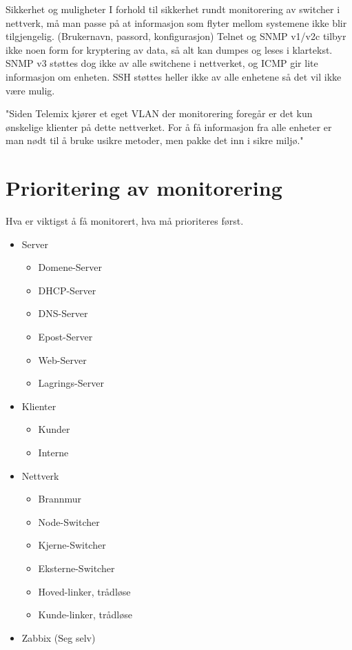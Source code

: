 \begin{tanke}{Sikkerhet og muligheter}
    I forhold til sikkerhet rundt monitorering av switcher i nettverk, må man passe på at informasjon som flyter mellom systemene ikke blir tilgjengelig. (Brukernavn, passord, konfigurasjon)
    Telnet og SNMP v1/v2c tilbyr ikke noen form for kryptering av data, så alt kan dumpes og leses i klartekst. SNMP v3 støttes dog ikke av alle switchene i nettverket, og ICMP gir lite informasjon om enheten.
    SSH støttes heller ikke av alle enhetene så det vil ikke være mulig.
    
    "Siden Telemix kjører et eget VLAN der monitorering foregår er det kun ønskelige klienter på dette nettverket. For å få informasjon fra alle enheter er man nødt til å bruke usikre metoder, men pakke det inn i sikre miljø."
\end{tanke}

\section{Prioritering av monitorering}

Hva er viktigst å få monitorert, hva må prioriteres først.

\begin{itemize}
    \item Server
    \begin{itemize}
        \item Domene-Server
        \item DHCP-Server
        \item DNS-Server
        \item Epost-Server
        \item Web-Server
        \item Lagrings-Server
    \end{itemize}
    \item Klienter
    \begin{itemize}
        \item Kunder
        \item Interne
    \end{itemize}
    \item Nettverk
    \begin{itemize}
        \item Brannmur
        \item Node-Switcher
        \item Kjerne-Switcher
        \item Eksterne-Switcher
        \item Hoved-linker, trådløse
        \item Kunde-linker, trådløse
    \end{itemize}
    \item Zabbix (Seg selv)
\end{itemize}

